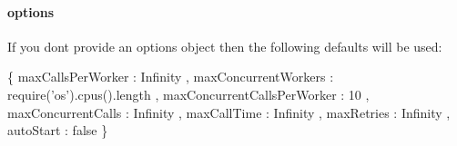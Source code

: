 \paragraph*{{\ttfamily options}}

If you don\textquotesingle{}t provide an {\ttfamily options} object then the following defaults will be used\+:


\begin{DoxyCode}
\{
    maxCallsPerWorker           : Infinity
  , maxConcurrentWorkers        : require('os').cpus().length
  , maxConcurrentCallsPerWorker : 10
  , maxConcurrentCalls          : Infinity
  , maxCallTime                 : Infinity
  , maxRetries                  : Infinity
  , autoStart                   : false
\}
\end{DoxyCode}



